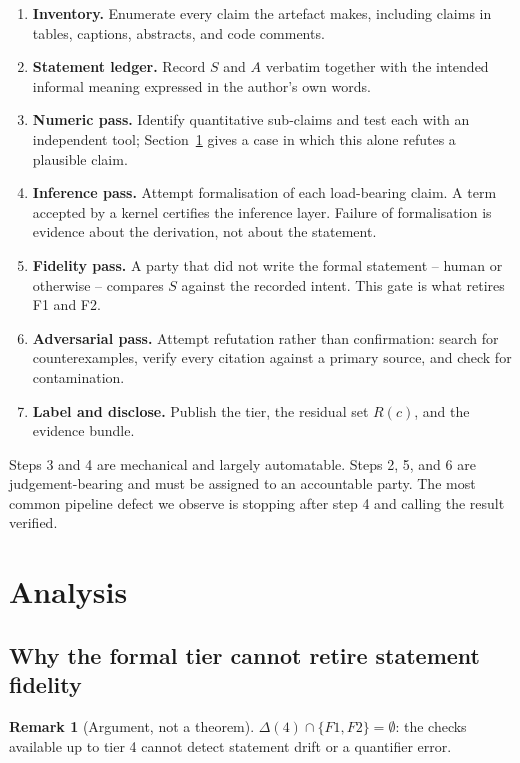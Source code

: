 \documentclass[11pt]{article}
\theoremstyle{plain}
\theoremstyle{definition}
\newtheorem{remark}{Remark}
\begin{document}
\begin{enumerate}[leftmargin=*,itemsep=2pt]
\item \textbf{Inventory.} Enumerate every claim the artefact makes, including claims in
tables, captions, abstracts, and code comments.
\item \textbf{Statement ledger.} Record $S$ and $A$ verbatim together with the intended
informal meaning expressed in the author's own words.
\item \textbf{Numeric pass.} Identify quantitative sub-claims and test each with an
independent tool; Section~\ref{sec:analysis} gives a case in which this alone refutes a
plausible claim.
\item \textbf{Inference pass.} Attempt formalisation of each load-bearing claim. A term
accepted by a kernel certifies the inference layer. Failure of formalisation is evidence
about the derivation, not about the statement.
\item \textbf{Fidelity pass.} A party that did not write the formal statement -- human or
otherwise -- compares $S$ against the recorded intent. This gate is what retires F1 and F2.
\item \textbf{Adversarial pass.} Attempt refutation rather than confirmation: search for
counterexamples, verify every citation against a primary source, and check for
contamination.
\item \textbf{Label and disclose.} Publish the tier, the residual set $R(c)$, and the evidence
bundle.
\end{enumerate}

Steps 3 and 4 are mechanical and largely automatable. Steps 2, 5, and 6 are judgement-bearing
and must be assigned to an accountable party. The most common pipeline defect we observe is
stopping after step 4 and calling the result verified.
\section{Analysis}
\label{sec:analysis}

\subsection{Why the formal tier cannot retire statement fidelity}

\begin{remark}[Argument, not a theorem]
$\Delta(4)\cap\{F1,F2\}=\emptyset$: the checks available up to tier 4 cannot detect statement
drift or a quantifier error.
\end{remark}
\end{document}
